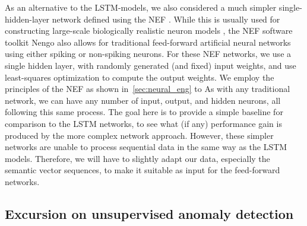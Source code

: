 As an alternative to the \ac{LSTM}-models, we also considered a much simpler single-hidden-layer network defined using the \acf{NEF} \parencite{Eliasmith2003}.
While this is usually used for constructing large-scale biologically realistic neuron models \parencite{Eliasmith2012}, the \ac{NEF} software toolkit \acs{Nengo} \parencite{Bekolay2014} also allows for traditional feed-forward artificial neural networks using either spiking or non-spiking neurons.
For these \ac{NEF} networks, we use a single hidden layer, with randomly generated (and fixed) input weights, and use least-squares optimization to compute the output weights.
We employ the principles of the \ac{NEF} as shown in~\ref{sec:neural_eng} to 
As with any traditional network, we can have any number of input, output, and hidden neurons, all following this same process.
The goal here is to provide a simple baseline for comparison to the \ac{LSTM} networks, to see what (if any) performance gain is produced by the more complex network approach.
However, these simpler networks are unable to process sequential data in the same way as the \ac{LSTM} models.
Therefore, we will have to slightly adapt our data, especially the semantic vector sequences, to make it suitable as input for the feed-forward networks.

\subsection{Excursion on unsupervised anomaly detection}%
\label{subsec:excursion_on_unsupervised_anomaly_detection}

